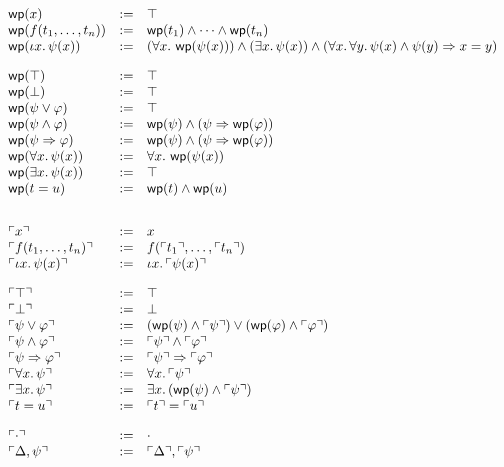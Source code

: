 \documentclass[11pt]{article}
\begin{document}
\[
\begin{array}{lll}
  \mathop{\mathsf{wp}}(x) & := & \top\\
  \mathop{\mathsf{wp}}(f({t}_1,\ldots,{t}_{n})) & := & \mathop{\mathsf{wp}}(t_1) \wedge \cdots \wedge \mathop{\mathsf{wp}}(t_n)\\
  \mathop{\mathsf{wp}}(\iota x.\, \psi(x)) & := &
       (\forall x.\, \mathop{\mathsf{wp}}(\psi(x))) \wedge
       (\exists x.\, \psi(x)) \wedge
       (\forall x.\, \forall y.\, \psi(x) \wedge \psi(y) \Rightarrow x=y)\\[10pt]

  \mathop{\mathsf{wp}}(\top) & := & \top\\
  \mathop{\mathsf{wp}}(\bot) & := & \top\\
  \mathop{\mathsf{wp}}(\psi \vee \varphi) & := & \top\\
  \mathop{\mathsf{wp}}(\psi \wedge \varphi) & := & \mathop{\mathsf{wp}}(\psi) \wedge (\psi \Rightarrow \mathop{\mathsf{wp}}(\varphi))\\
  \mathop{\mathsf{wp}}(\psi \Rightarrow \varphi) & := & \mathop{\mathsf{wp}}(\psi) \wedge (\psi \Rightarrow \mathop{\mathsf{wp}}(\varphi))\\
  \mathop{\mathsf{wp}}(\forall x.\, \psi(x)) & := & \forall x.\, \mathop{\mathsf{wp}}(\psi(x))\\
  \mathop{\mathsf{wp}}(\exists x.\, \psi(x)) & := & \top\\
  \mathop{\mathsf{wp}}(t = u) & := & \mathop{\mathsf{wp}}(t) \wedge \mathop{\mathsf{wp}}(u)\\[20pt]
  
  \ulcorner x \urcorner & := & x\\
  \ulcorner f({t}_1,\ldots,{t}_{n}) \urcorner & := & f(\ulcorner t_1 \urcorner,\ldots,\ulcorner t_n \urcorner)\\
  \ulcorner \iota x.\, \psi(x) \urcorner & := & \iota x.\, \ulcorner \psi(x) \urcorner\\[10pt]
  
  \ulcorner \top \urcorner & := & \top\\
  \ulcorner \bot \urcorner & := & \bot\\
  \ulcorner \psi \vee \varphi \urcorner & := & (\mathop{\mathsf{wp}}(\psi) \wedge \ulcorner \psi \urcorner) \vee (\mathop{\mathsf{wp}}(\varphi) \wedge \ulcorner \varphi \urcorner)\\
  \ulcorner \psi \wedge \varphi \urcorner & := & \ulcorner \psi \urcorner \wedge \ulcorner \varphi \urcorner\\
  \ulcorner \psi \Rightarrow \varphi \urcorner & := & \ulcorner \psi \urcorner \Rightarrow \ulcorner \varphi \urcorner\\
  \ulcorner \forall x.\, \psi \urcorner & := & \forall x.\, \ulcorner \psi \urcorner \\
  \ulcorner \exists x.\, \psi \urcorner & := & \exists x.\, (\mathop{\mathsf{wp}}(\psi) \wedge \ulcorner \psi \urcorner)\\
  \ulcorner t = u \urcorner & := & \ulcorner t \urcorner = \ulcorner u \urcorner\\[10pt]
  
  \ulcorner \cdot \urcorner & := & \cdot\\
  \ulcorner \Delta,\psi \urcorner & := & \ulcorner \Delta \urcorner,\ulcorner \psi \urcorner\\
\end{array}
\]
\end{document}
